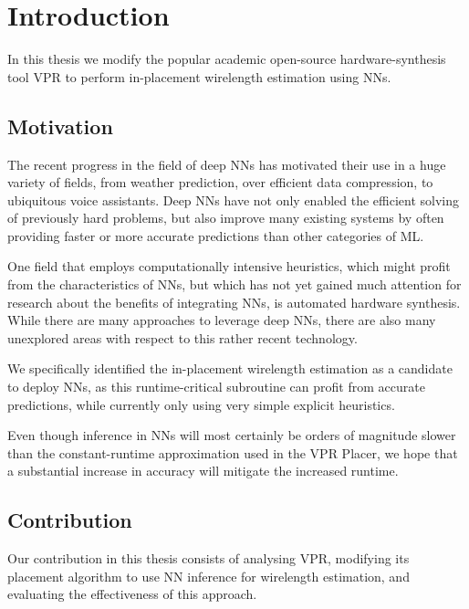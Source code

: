 
\chapter{Introduction}\label{ch:introduction}
\glsresetall %

In this thesis we modify the popular academic open-source hardware-synthesis tool \gls{VPR}\cite{vtr8} to perform in-placement wirelength estimation using \glspl{NN}.

\section{Motivation}

The recent progress in the field of deep \glspl{NN} has motivated their use in a huge variety of fields, from weather prediction, over efficient data compression, to ubiquitous voice assistants.\cite{TODO-something} Deep \glspl{NN} have not only enabled the efficient solving of previously hard problems, but also improve many existing systems by often providing faster or more accurate predictions than other categories of \gls{ML}.

One field that employs computationally intensive heuristics, which might profit from the characteristics of \glspl{NN}, but which has not yet gained much attention for research about the benefits of integrating \glspl{NN}, is automated hardware synthesis. While there are many approaches to leverage deep \glspl{NN}, there are also many unexplored areas with respect to this rather recent technology.

We specifically identified the in-placement wirelength estimation as a candidate to deploy \glspl{NN}, as this runtime-critical subroutine can profit from accurate predictions, while currently only using very simple explicit heuristics.

Even though inference in \glspl{NN} will most certainly be orders of magnitude slower than the constant-runtime approximation used in the \gls{VPR} Placer, we hope that a substantial increase in accuracy will mitigate the increased runtime.

\section{Contribution}

Our contribution in this thesis consists of analysing \gls{VPR}, modifying its placement algorithm to use \gls{NN} inference for wirelength estimation, and evaluating the effectiveness of this approach.

